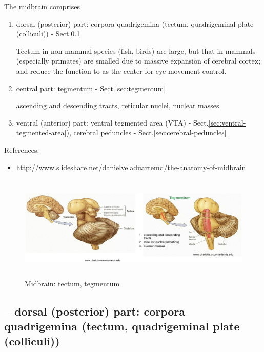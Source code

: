 The midbrain comprises %
\begin{enumerate}
  
  \item dorsal (posterior) part: corpora quadrigemina (tectum, quadrigeminal
  plate (colliculi)) - Sect.\ref{sec:corpora-quadrigemina}

Tectum in non-mammal species (fish, birds) are large, but that in mammals
(especially primates) are smalled due to massive expansion of cerebral cortex;
and reduce the function to as the center for eye movement control.
  
  \item central part: tegmentum - Sect.\ref{sec:tegmentum}
  
  ascending and descending tracts, reticular nuclei, nuclear masses
  
  \item ventral (anterior) part: ventral tegmented area (VTA) -
  Sect.\ref{sec:ventral-tegmented-area}), cerebral peduncles -
  Sect.\ref{sec:cerebral-peduncles}
  
\end{enumerate}
References:
\begin{itemize}
  \item
  \url{http://www.slideshare.net/danielveladuartemd/the-anatomy-of-midbrain}
\end{itemize}

\begin{figure}[hbt]
  \centerline{
  \includegraphics[height=5cm,
    angle=0]{./images/midbrain.eps}}
\caption{Midbrain: tectum, tegmentum}
\label{fig:midbrain}
\end{figure}

\subsection{-- dorsal (posterior) part: corpora quadrigemina (tectum,
quadrigeminal plate (colliculi))}
\label{sec:corpora-quadrigemina}
\label{sec:tectum}
\label{sec:inferior-colliculus}
\label{sec:superior-colliculus}

